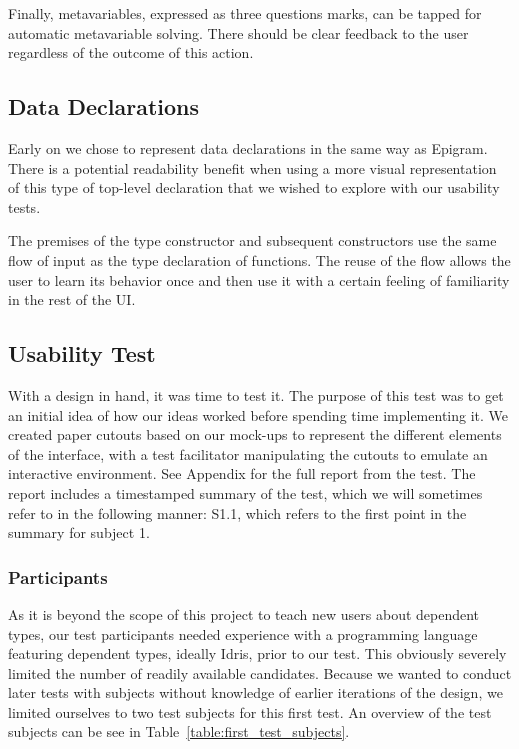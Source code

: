 Finally, metavariables,
expressed as three questions marks, can be tapped for automatic metavariable
solving. There should be clear feedback to the user regardless of the outcome
of this action.

\subsection{Data Declarations}
Early on we chose to represent data declarations in the same way as Epigram.
There is a potential readability benefit when using a more visual
representation of this type of top-level declaration that we wished to explore
with our usability tests.

The premises of the type constructor and subsequent constructors use the same flow of input as the type declaration of functions.
The reuse of the flow allows the user to learn its behavior once and then use it with a certain feeling of familiarity
in the rest of the UI\@.


\subsection{Usability Test}
\label{sec:UsabilityTest}
With a design in hand, it was time to test it. The purpose of this test was to
get an initial idea of how our ideas worked before spending time implementing
it. We created paper cutouts based on our mock-ups to represent the different
elements of the interface, with a test facilitator manipulating the cutouts to
emulate an interactive environment. See Appendix  for the full report
from the test. The report includes a timestamped summary of the test, which we
will sometimes refer to in the following manner: S1.1, which refers to the
first point in the summary for subject 1.

\subsubsection{Participants}
As it is beyond the scope of this project to teach new users about dependent
types, our test participants needed experience with a programming language
featuring dependent types, ideally Idris, prior to our test. This obviously
severely limited the number of readily available candidates. Because we wanted
to conduct later tests with subjects without knowledge of earlier iterations of
the design, we limited ourselves to two test subjects for this first test. An
overview of the test subjects can be see in Table~\ref{table:first_test_subjects}.

